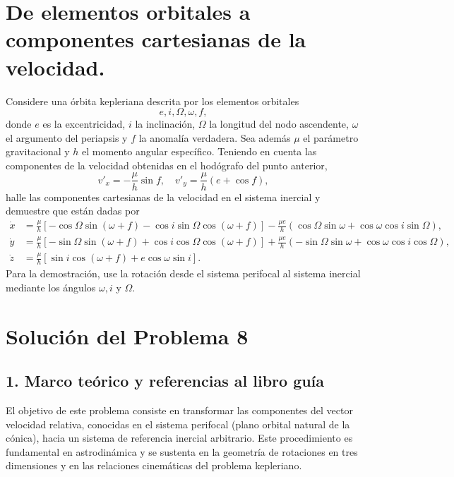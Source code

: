 \documentclass[12pt, a4paper]{article}
\begin{document}
\section{De elementos orbitales a componentes cartesianas de la velocidad.} Considere una órbita kepleriana descrita por los elementos orbitales
$$e, i, \Omega, \omega, f,$$
donde $e$ es la excentricidad, $i$ la inclinación, $\Omega$ la longitud del nodo ascendente, $\omega$ el argumento del periapsis y $f$ la anomalía verdadera. Sea además $\mu$ el parámetro gravitacional y $h$ el momento angular específico. Teniendo en cuenta las componentes de la velocidad obtenidas en el hodógrafo del punto anterior,
$$v'_x = -\frac{\mu}{h} \sin f, \quad v'_y = \frac{\mu}{h} (e + \cos f),$$
halle las componentes cartesianas de la velocidad en el sistema inercial y demuestre que están dadas por
\begin{align*}
\dot{x} &= \frac{\mu}{h} \left[ -\cos\Omega \sin(\omega+f) - \cos i \sin\Omega \cos(\omega+f) \right] - \frac{\mu e}{h} \left( \cos\Omega \sin\omega + \cos\omega \cos i \sin\Omega \right), \\
\dot{y} &= \frac{\mu}{h} \left[ -\sin\Omega \sin(\omega+f) + \cos i \cos\Omega \cos(\omega+f) \right] + \frac{\mu e}{h} \left( -\sin\Omega \sin\omega + \cos\omega \cos i \cos\Omega \right), \\
\dot{z} &= \frac{\mu}{h} \left[ \sin i \cos(\omega+f) + e \cos\omega \sin i \right].
\end{align*}
Para la demostración, use la rotación desde el sistema perifocal al sistema inercial mediante los ángulos $\omega, i$ y $\Omega$.



\section*{Solución del Problema 8}

\subsection*{1. Marco teórico y referencias al libro guía}
El objetivo de este problema consiste en transformar las componentes del vector velocidad relativa, conocidas en el sistema perifocal (plano orbital natural de la cónica), hacia un sistema de referencia inercial arbitrario. Este procedimiento es fundamental en astrodinámica y se sustenta en la geometría de rotaciones en tres dimensiones y en las relaciones cinemáticas del problema kepleriano.
\end{document}
